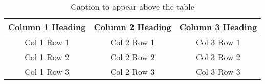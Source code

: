 \begin{table}[ht]

    \begin{center}

    \caption{Caption to appear above the table}
    \begin{tabular}[c]{|c|c|c|}
        \hline
        Column 1 Heading & Column 2 Heading & Column 3 Heading \\
        \hline
        Col 1 Row 1 & Col 2 Row 1 & Col 3 Row 1\\
        Col 1 Row 2 & Col 2 Row 2 & Col 3 Row 2\\
        Col 1 Row 3 & Col 2 Row 3 & Col 3 Row 3\\
        \hline
    \end{tabular}

    \label{table1}
   \end{center}
\end{table}




